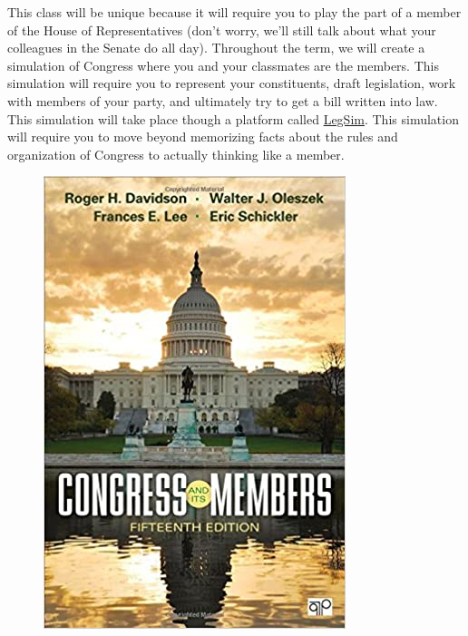 \documentclass[11pt]{article}
\begin{document}
This class will be unique because it will require you to play the part of a member of the House of Representatives (don't worry, we'll still talk about what your colleagues in the Senate do all day). Throughout the term, we will create a simulation of Congress where you and your classmates are the members. This simulation will require you to represent your constituents, draft legislation, work with members of your party, and ultimately try to get a bill written into law. This simulation will take place though a platform called \href{http://info.legsim.org/students/}{LegSim}. This simulation will require you to move beyond memorizing facts about the rules and organization of Congress to actually thinking like a member. 

\begin{figure}
\centering
\href{https://www.amazon.com/Congress-Its-Members-Roger-Davidson/dp/1483388883}{\includegraphics[width=0.9\linewidth]{congress.jpg}}
\end{figure}
\end{document}
